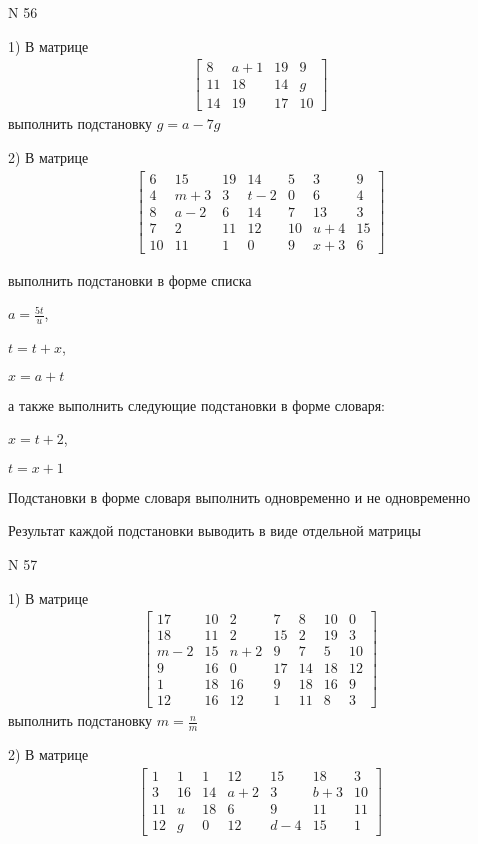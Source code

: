 \documentclass[11pt]{report}
\begin{document}
\newpage
N 56


    1) В матрице
\begin{align*}
\left[\begin{matrix}8 & a + 1 & 19 & 9\\11 & 18 & 14 & g\\14 & 19 & 17 & 10\end{matrix}\right]
\end{align*}
выполнить подстановку $g=a - 7 g$


    2) В матрице
\begin{align*}
\left[\begin{matrix}6 & 15 & 19 & 14 & 5 & 3 & 9\\4 & m + 3 & 3 & t - 2 & 0 & 6 & 4\\8 & a - 2 & 6 & 14 & 7 & 13 & 3\\7 & 2 & 11 & 12 & 10 & u + 4 & 15\\10 & 11 & 1 & 0 & 9 & x + 3 & 6\end{matrix}\right]
\end{align*}

выполнить подстановки в форме списка

$a=\frac{5 t}{u}$,

$t=t + x$,

$x=a + t$

а также выполнить следующие подстановки в форме словаря:

$x=t + 2$,

$t=x + 1$


    Подстановки в форме словаря выполнить одновременно и не одновременно


    Результат каждой подстановки выводить в виде отдельной матрицы

\newpage
N 57


    1) В матрице
\begin{align*}
\left[\begin{matrix}17 & 10 & 2 & 7 & 8 & 10 & 0\\18 & 11 & 2 & 15 & 2 & 19 & 3\\m - 2 & 15 & n + 2 & 9 & 7 & 5 & 10\\9 & 16 & 0 & 17 & 14 & 18 & 12\\1 & 18 & 16 & 9 & 18 & 16 & 9\\12 & 16 & 12 & 1 & 11 & 8 & 3\end{matrix}\right]
\end{align*}
выполнить подстановку $m=\frac{n}{m}$


    2) В матрице
\begin{align*}
\left[\begin{matrix}1 & 1 & 1 & 12 & 15 & 18 & 3\\3 & 16 & 14 & a + 2 & 3 & b + 3 & 10\\11 & u & 18 & 6 & 9 & 11 & 11\\12 & g & 0 & 12 & d - 4 & 15 & 1\end{matrix}\right]
\end{align*}
\end{document}
